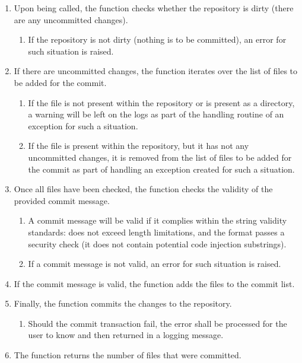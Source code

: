 \begin{enumerate}
    \item Upon being called, the function checks whether the repository is dirty (there are any uncommitted changes).
    \begin{enumerate}
        \item If the repository is not dirty (nothing is to be committed), an error for such situation is raised.
    \end{enumerate}

    \item If there are uncommitted changes, the function iterates over the list of files to be added for the commit.
    \begin{enumerate}
        \item If the file is not present within the repository or is present as a directory, a warning will be left on the logs as part of the handling routine of an exception
        for such a situation.

        \item If the file is present within the repository, but it has not any uncommitted changes, it is removed from the list of files to be added for the commit as part of 
        handling an exception created for such a situation.
    \end{enumerate}

    \item Once all files have been checked, the function checks the validity of the provided commit message.
    \begin{enumerate}
        \item A commit message will be valid if it complies within the string validity standards: does not exceed length limitations, and the format passes a security check (it does not contain potential code injection substrings).
        \item If a commit message is not valid, an error for such situation is raised.
    \end{enumerate}

    \item If the commit message is valid, the function adds the files to the commit list.
    
    \item Finally, the function commits the changes to the repository.
    \begin{enumerate}
        \item Should the commit transaction fail, the error shall be processed for the user to know and then returned in a logging message.
    \end{enumerate}

    \item The function returns the number of files that were committed.
\end{enumerate}

